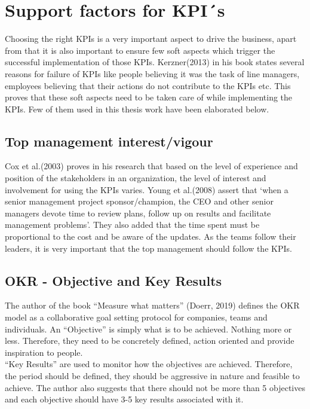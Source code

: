 \section{Support factors for KPI´s}
Choosing the right KPIs is a very important aspect to drive the business, apart from that it is also important to ensure few soft aspects which trigger the successful implementation of those KPIs. Kerzner(2013) in his book states several reasons for failure of KPIs like people believing it was the task of line managers, employees believing that their actions do not contribute to the KPIs etc. This proves that these soft aspects need to be taken care of while implementing the KPIs. Few of them used in this thesis work have been elaborated below.\\

\subsection{Top management interest/vigour}
Cox et al.(2003) proves in his research that based on the level of experience and position of the stakeholders in an organization, the level of interest and involvement for using the KPIs varies. Young et al.(2008) assert that ‘when a senior management project sponsor/champion, the CEO and other senior managers devote time to review plans, follow up on results and facilitate management problems’. They also added that the time spent must be proportional to the cost and be aware of the updates. As the teams follow their leaders, it is very important that the top management should follow the KPIs. \\

\subsection{OKR - Objective and Key Results}
The author of the book “Measure what matters” (Doerr, 2019) defines the OKR model as a collaborative goal setting protocol for companies, teams and individuals. An “Objective” is simply what is to be achieved. Nothing more or less. Therefore, they need to be concretely defined, action oriented and provide inspiration to people.\\
“Key Results” are used to monitor how the objectives are achieved. Therefore, the period should be defined, they should be aggressive in nature and feasible to achieve. The author also suggests that there should not be more than 5 objectives and each objective should have 3-5 key results associated with it.\\

